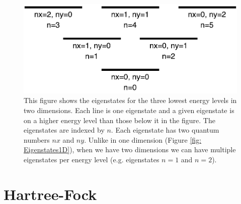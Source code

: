 \documentclass[../main.tex]{subfiles}
\begin{document}
\begin{figure}[!ht]
    \centering
    \includegraphics[scale=0.7]{figures/Eigenstates2D}
    \caption{This figure shows the eigenstates for the three lowest energy levels in two dimensions. Each line is one eigenstate and a given eigenstate is on a higher energy level than those below it in the figure. The eigenstates are indexed by $n$. Each eigenstate has two quantum numbers $nx$ and $ny$. Unlike in one dimension (Figure \ref{fig: Eigenstates1D}), when we have two dimensions we can have multiple eigenstates per energy level (e.g. eigenstates $n=1$ and $n=2$).}
    \label{fig: Eigenstates2D}
\end{figure}


\chapter{Hartree-Fock}\label{sec: HF}
\end{document}
